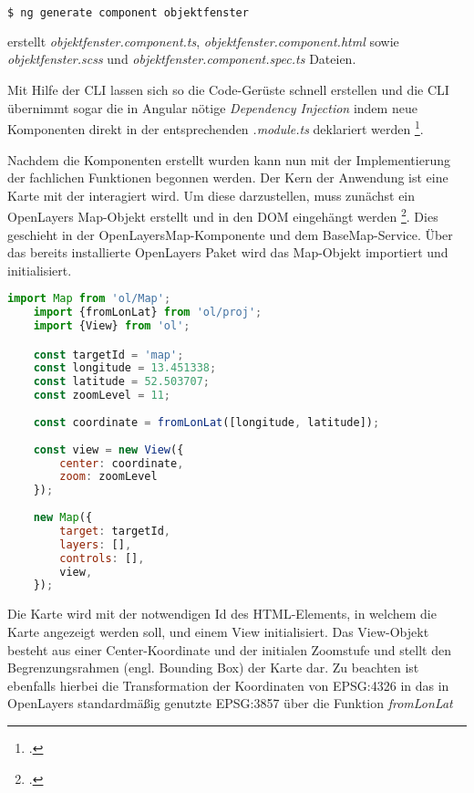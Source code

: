 \begin{lstlisting}[language=bash]
$ ng generate component objektfenster
\end{lstlisting}

erstellt \emph{objektfenster.component.ts}, \emph{objektfenster.component.html} sowie \emph{objektfenster.scss} und \emph{objektfenster.component.spec.ts} Dateien.

Mit Hilfe der CLI lassen sich so die Code-Gerüste schnell erstellen und die CLI übernimmt sogar die in Angular nötige \emph{Dependency Injection} indem neue Komponenten direkt in der entsprechenden \emph{.module.ts} deklariert werden \footcite{angular_cli}.

Nachdem die Komponenten erstellt wurden kann nun mit der Implementierung der fachlichen Funktionen begonnen werden.
Der Kern der Anwendung ist eine Karte mit der interagiert wird.
Um diese darzustellen, muss zunächst ein OpenLayers Map-Objekt erstellt und in den DOM eingehängt werden \footcite{openlayers_map}.
Dies geschieht in der OpenLayersMap-Komponente und dem BaseMap-Service.
Über das bereits installierte OpenLayers Paket wird das Map-Objekt importiert und initialisiert.

\begin{lstlisting}[language=JavaScript]
	import Map from 'ol/Map';
	import {fromLonLat} from 'ol/proj';
	import {View} from 'ol';

	const targetId = 'map';
	const longitude = 13.451338;
	const latitude = 52.503707;
	const zoomLevel = 11;
	
	const coordinate = fromLonLat([longitude, latitude]);
	
	const view = new View({
		center: coordinate,
		zoom: zoomLevel
	});
	
	new Map({
		target: targetId,
		layers: [],
		controls: [],
		view,
	});


\end{lstlisting}

Die Karte wird mit der notwendigen Id des HTML-Elements, in welchem die Karte angezeigt werden soll, und einem View initialisiert.
Das View-Objekt besteht aus einer Center-Koordinate und der initialen Zoomstufe und stellt den Begrenzungsrahmen (engl. Bounding Box) der Karte dar.
Zu beachten ist ebenfalls hierbei die Transformation der Koordinaten von EPSG:4326 in das in OpenLayers standardmäßig genutzte EPSG:3857 über die Funktion \emph{fromLonLat}
